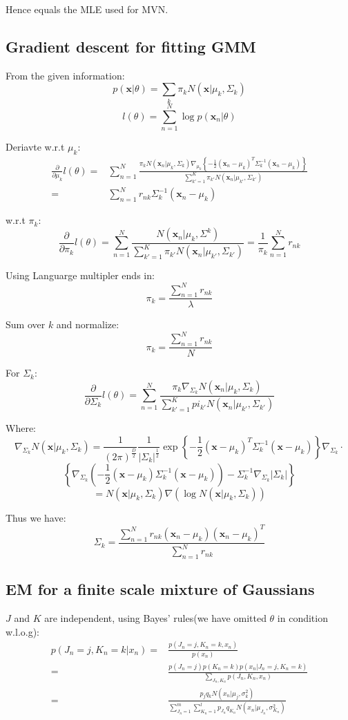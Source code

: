 \documentclass[UTF8]{ctexart}
\begin{document}
Hence equals the MLE used for MVN.

\subsection{Gradient descent for fitting GMM}
From the given information:
$$p(\textbf{x}|\theta)=\sum_{k}\pi_{k}N(\textbf{x}|\mu_{k},\Sigma_{k})$$
$$l(\theta)=\sum_{n=1}^{N}\log p(\textbf{x}_{n}|\theta)$$

Deriavte w.r.t $\mu_{k}$:
\begin{align}
\frac{\partial}{\partial \mu_{k}}l(\theta) =& \sum_{n=1}^{N}\frac{\pi_{k}N(\textbf{x}_{n}|\mu_{k},\Sigma_{k})\nabla_{\mu_{k}}\left\{-\frac{1}{2}(\textbf{x}_{n}-\mu_{k})^{T}\Sigma_{k}^{-1}(\textbf{x}_{n}-\mu_{k})  \right\}}{\sum_{k'=1}^{K}\pi_{k'}N(\textbf{x}_{n}|\mu_{k'},\Sigma_{k'})}\nonumber \\
=&\sum_{n=1}^{N}r_{nk}\Sigma_{k}^{-1}(\textbf{x}_{n}-\mu_{k})\nonumber
\end{align}

w.r.t $\pi_{k}$:
$$\frac{\partial}{\partial \pi_{k}}l(\theta)=\sum_{n=1}^{N}\frac{N(\textbf{x}_{n}|\mu_{k},\Sigma^{k})}{\sum_{k'=1}^{K}\pi_{k'}N(\textbf{x}_{n}|\mu_{k'},\Sigma_{k'})}=\frac{1}{\pi_{k}}\sum_{n=1}^{N}r_{nk}$$

Using Languarge multipler ends in:
$$\pi_{k}=\frac{\sum_{n=1}^{N}r_{nk}}{\lambda}$$

Sum over $k$ and normalize:
$$\pi_{k}=\frac{\sum_{n=1}^{N}r_{nk}}{N}$$

For $\Sigma_{k}$:
$$\frac{\partial}{\partial \Sigma_{k}}l(\theta)=\sum_{n=1}^{N}\frac{\pi_{k}\nabla_{\Sigma_{k}}N(\textbf{x}_{n}|\mu_{k},\Sigma_{k})}{\sum_{k'=1}^{K}pi_{k'}N(\textbf{x}_{n}|\mu_{k'},\Sigma_{k'})}$$

Where:
$$\nabla_{\Sigma_{k}}N(\textbf{x}|\mu_{k},\Sigma_{k})=\frac{1}{(2\pi)^{\frac{D}{2}}}\frac{1}{|\Sigma_{k}|^{\frac{1}{2}}}\exp\left\{ -\frac{1}{2}(\textbf{x}-\mu_{k})^{T}\Sigma_{k}^{-1}(\textbf{x}-\mu_{k}) \right\}\nabla_{\Sigma_{k}}\cdot$$
$$\left\{ \nabla_{\Sigma_{k}}(-\frac{1}{2}(\textbf{x}-\mu_{k})\Sigma_{k}^{-1}(\textbf{x}-\mu_{k}))-\Sigma_{k}^{-1}\nabla_{\Sigma_{k}}|\Sigma_{k}| \right\}$$
$$=N(\textbf{x}|\mu_{k},\Sigma_{k})\nabla(\log N(\textbf{x}|\mu_{k},\Sigma_{k}))$$

Thus we have:
$$\Sigma_{k}=\frac{\sum_{n=1}^{N}r_{nk}(\textbf{x}_{n}-\mu_{k})(\textbf{x}_{n}-\mu_{k})^{T}}{\sum_{n=1}^{N}r_{nk}}$$

\subsection{EM for a finite scale mixture of Gaussians}
$J$ and $K$ are independent, using Bayes' rules(we have omitted $\theta$ in condition w.l.o.g):
\begin{align}
p(J_{n}=j,K_{n}=k|x_{n})=&\frac{p(J_{n}=j,K_{n}=k,x_{n})}{p(x_{n})}\nonumber \\
=&\frac{p(J_{n}=j)p(K_{n}=k)p(x_{n}|J_{n}=j,K_{n}=k)}{\sum_{J_{n},K_{n}}p(J_{n},K_{n},x_{n})}\nonumber \\
=&\frac{p_{j}q_{k}N(x_{n}|\mu_{j},\sigma^{2}_{k})}{\sum_{J_{n}=1}^{m}\sum_{K_{n}=1}^{l}p_{J_{n}}q_{K_{n}}N(x_{n}|\mu_{J_{n}},\sigma^{2}_{K_{n}})}\nonumber
\end{align}
\end{document}
